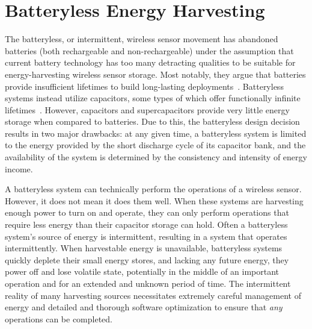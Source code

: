 \section{Batteryless Energy Harvesting}
\label{sec:background:batteryless}
The batteryless, or intermittent, wireless sensor movement has abandoned batteries (both rechargeable and non-rechargeable) under the assumption that current battery technology has too many detracting qualities to be suitable for energy-harvesting wireless sensor storage.
Most notably, they argue that batteries provide insufficient lifetimes to build long-lasting deployments~\cite{hesterTragedy15, hesterFlicker17, hesterTimely17, hester2017future, colinReconfigurable18, luciaIntermittent17, yervaGrafting12, majid2020continuous}.
Batteryless systems instead utilize capacitors, some types of which offer functionally infinite lifetimes~\cite{kemetLife}.
However, capacitors and supercapacitors provide very little energy storage when compared to batteries.
Due to this, the batteryless design decision results in two major drawbacks:
at any given time, a batteryless system is limited to the energy provided by the short discharge cycle of its capacitor bank,
and the availability of the system is determined by the consistency and intensity of energy income.

A batteryless system can technically perform the operations of a wireless sensor.
However, it does not mean it does them well.
When these systems are harvesting enough power to turn on and operate, they can only perform operations that require less energy than their capacitor storage can hold.
Often a batteryless system's source of energy is intermittent, resulting in a system that operates intermittently.
When harvestable energy is unavailable, batteryless systems quickly deplete their
small energy stores, and lacking any future energy,
they power off and lose
volatile state, potentially in the middle of an important operation and for an extended and unknown period of time.
The intermittent reality of many harvesting sources necessitates extremely careful management of energy
and detailed and thorough software optimization
to ensure that \textit{any} operations can be completed.

